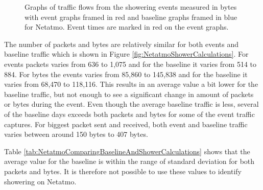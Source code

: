\begin{figure}[H]
\begin{subfigure}[b]{0.47\textwidth}
    \end{subfigure}
        \begin{subfigure}[b]{0.47\textwidth}
        \centering
    \end{subfigure}
    \begin{subfigure}[b]{0.47\textwidth}
        \centering
    \end{subfigure}
    \begin{subfigure}[b]{0.47\textwidth}
        \centering
    \end{subfigure}
    \hspace{0.6cm}
    \begin{subfigure}[b]{0.47\textwidth}
    \centering
        \end{subfigure}
    \caption{Graphs of traffic flows from the showering events measured in bytes with event graphs framed in red and baseline graphs framed in blue for Netatmo. Event times are marked in red on the event graphs.}    
    \label{fig:NetatmoShowerBytes2}
\end{figure}

The number of packets and bytes are relatively similar for both events and baseline traffic which is shown in Figure \ref{fig:NetatmoShowerCalculations}. For events packets varies from 636 to 1,075 and for the baseline it varies from 514 to 884. For bytes the events varies from 85,860 to 145,838 and for the baseline it varies from 68,470 to 118,116. This results in an average value a bit lower for the baseline traffic, but not enough to see a significant change in amount of packets or bytes during the event. Even though the average baseline traffic is less, several of the baseline days exceeds both packets and bytes for some of the event traffic captures. For biggest packet sent and received, both event and baseline traffic varies between around 150 bytes to 407 bytes. 

Table \ref{tab:NetatmoComparingBaselineAndShowerCalculations} shows that the average value for the baseline is within the range of standard deviation for both packets and bytes. It is therefore not possible to use these values to identify showering on Netatmo. 

